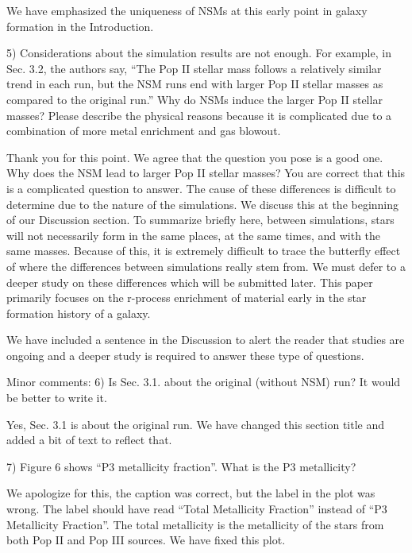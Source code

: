 \documentclass[11pt]{article}
\begin{document}
We have emphasized the uniqueness of NSMs at this early point in galaxy formation in the Introduction.

\begin{tcolorbox}[colback={lightgray}] 
    5)      Considerations about the simulation results are not enough. For example, in Sec. 3.2, the authors say, “The Pop II stellar mass follows a relatively similar trend in each run, but the NSM runs end with larger Pop II stellar masses as compared to the original run.” Why do NSMs induce the larger Pop II stellar masses? Please describe the physical reasons because it is complicated due to a combination of more metal enrichment and gas blowout.
\end{tcolorbox}

Thank you for this point. We agree that the question you pose is a good one. Why does the NSM lead to larger Pop II stellar masses? You are correct that this is a complicated question to answer. The cause of these differences is difficult to determine due to the nature of the simulations. We discuss this at the beginning of our Discussion section. To summarize briefly here, between simulations, stars will not necessarily form in the same places, at the same times, and with the same masses. Because of this, it is extremely difficult to trace the butterfly effect of where the differences between simulations really stem from. We must defer to a deeper study on these differences which will be submitted later. This paper primarily focuses on the r-process enrichment of material early in the star formation history of a galaxy.

We have included a sentence in the Discussion to alert the reader that studies are ongoing and a deeper study is required to answer these type of questions.

\begin{tcolorbox}[colback={lightgray}]
    Minor comments:
    6)      Is Sec. 3.1. about the original (without NSM) run? It would be better to write it.
\end{tcolorbox}

Yes, Sec. 3.1 is about the original run. We have changed this section title and added a bit of text to reflect that.

\begin{tcolorbox}[colback={lightgray}]
    7)      Figure 6 shows “P3 metallicity fraction”. What is the P3 metallicity?
\end{tcolorbox}

We apologize for this, the caption was correct, but the label in the plot was wrong. The label should have read ``Total Metallicity Fraction'' instead of ``P3 Metallicity Fraction''. The total metallicity is the metallicity of the stars from both Pop II and Pop III sources. We have fixed this plot.
\end{document}
